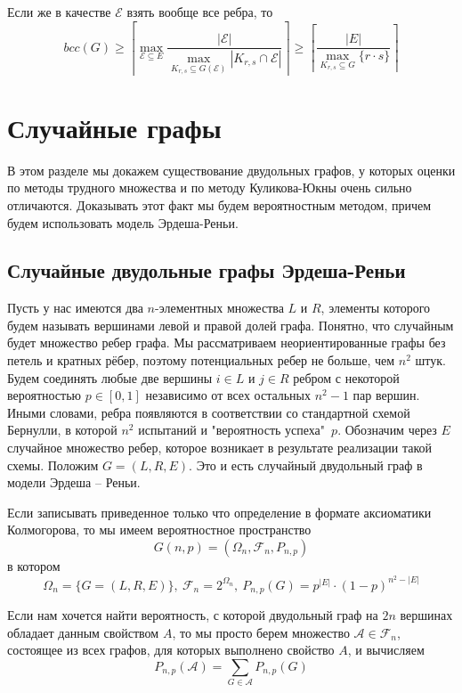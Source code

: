 \documentclass[a4paper]{article}
\begin{document}
Если же в качестве $\mathcal{E}$ взять вообще все ребра, то $$bcc(G) \geq \left\lceil\max\limits_{\mathcal{E}\subseteq E}\frac{|\mathcal{E}|}
{\max\limits_{K_{r,s}\subseteq G(\mathcal{E})}|K_{r,s}\cap\mathcal{E}|}\right\rceil \geq \left\lceil\frac{|E|}
{\max\limits_{K_{r,s}\subseteq G}\{r\cdot s\}}\right\rceil$$

\setcounter{mclaim}{0}
\setcounter{mlemma}{0}
\setcounter{mtheorem}{0}
\addtocounter{section}{1}
\section*{Случайные графы}
В этом разделе мы докажем существование двудольных графов, у которых оценки по методы трудного множества и 
по методу Куликова-Юкны очень сильно отличаются. Доказывать этот факт мы будем вероятностным методом, 
причем будем использовать модель Эрдеша-Реньи.

\setcounter{subsection}{0}
\subsection{Случайные двудольные графы Эрдеша-Реньи}

Пусть у нас имеются два $n$-элементных множества $L$ и $R$, элементы которого будем называть вершинами 
левой и правой долей графа. Понятно, что случайным будет множество ребер графа. Мы рассматриваем 
неориентированные графы без петель и кратных рёбер, поэтому потенциальных ребер не больше, чем $n^2$ штук. 
Будем соединять любые две вершины $i \in L$ и $j \in R$ ребром с некоторой вероятностью $p\in [0, 1]$ 
независимо от всех остальных $n^2 - 1$ пар вершин. Иными словами, ребра появляются в соответствии со 
стандартной схемой Бернулли, в которой $n^2$ испытаний и "вероятность успеха"\ $p$. Обозначим через $E$
случайное множество ребер, которое возникает в результате реализации такой схемы. Положим $G = (L, R, E)$. 
Это и есть случайный двудольный граф в модели Эрдеша – Реньи. 

Если записывать приведенное только что определение в формате аксиоматики Колмогорова, то мы имеем 
вероятностное пространство $$G(n, p) = (\Omega_n, \mathcal{F}_n, P_{n,p})$$ в котором 
$$\Omega_n = \{G = (L, R, E)\},\ \mathcal{F}_n = 2^{\Omega_n},\ P_{n,p}(G) = p^{|E|}\cdot(1-p)^{n^2 -|E|}$$

Если нам хочется найти вероятность, с которой двудольный граф на $2n$ вершинах обладает данным свойством $A$, 
то мы просто берем множество $\mathcal{A} \in \mathcal{F}_n$, состоящее из всех графов, для которых 
выполнено свойство $A$, и вычисляем $$P_{n,p}(\mathcal{A}) = \sum\limits_{G\in\mathcal{A}}P_{n,p}(G)$$
\end{document}
